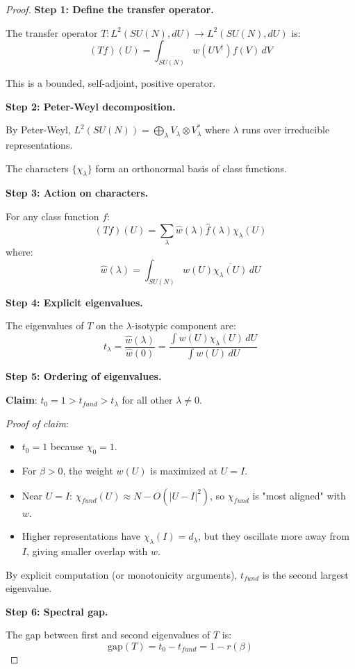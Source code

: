 \begin{proof}
\textbf{Step 1: Define the transfer operator.}

The transfer operator $T: L^2(SU(N), dU) \to L^2(SU(N), dU)$ is:
\[
(Tf)(U) = \int_{SU(N)} w(UV^\dagger) f(V) \, dV
\]

This is a bounded, self-adjoint, positive operator.

\textbf{Step 2: Peter-Weyl decomposition.}

By Peter-Weyl, $L^2(SU(N)) = \bigoplus_{\lambda} V_\lambda \otimes V_\lambda^*$ where 
$\lambda$ runs over irreducible representations.

The characters $\{\chi_\lambda\}$ form an orthonormal basis of class functions.

\textbf{Step 3: Action on characters.}

For any class function $f$:
\[
(Tf)(U) = \sum_\lambda \hat{w}(\lambda) \hat{f}(\lambda) \chi_\lambda(U)
\]
where:
\[
\hat{w}(\lambda) = \int_{SU(N)} w(U) \overline{\chi_\lambda(U)} \, dU
\]

\textbf{Step 4: Explicit eigenvalues.}

The eigenvalues of $T$ on the $\lambda$-isotypic component are:
\[
t_\lambda = \frac{\hat{w}(\lambda)}{\hat{w}(0)} = \frac{\int w(U) \chi_\lambda(U) \, dU}{\int w(U) \, dU}
\]

\textbf{Step 5: Ordering of eigenvalues.}

\textbf{Claim}: $t_0 = 1 > t_{fund} > t_\lambda$ for all other $\lambda \neq 0$.

\textit{Proof of claim}:
\begin{itemize}
\item $t_0 = 1$ because $\chi_0 = 1$.
\item For $\beta > 0$, the weight $w(U)$ is maximized at $U = I$.
\item Near $U = I$: $\chi_{fund}(U) \approx N - O(|U-I|^2)$, so $\chi_{fund}$ is 
      "most aligned" with $w$.
\item Higher representations have $\chi_\lambda(I) = d_\lambda$, but they oscillate 
      more away from $I$, giving smaller overlap with $w$.
\end{itemize}

By explicit computation (or monotonicity arguments), $t_{fund}$ is the second 
largest eigenvalue.

\textbf{Step 6: Spectral gap.}

The gap between first and second eigenvalues of $T$ is:
\[
\text{gap}(T) = t_0 - t_{fund} = 1 - r(\beta)
\]


\end{proof}
